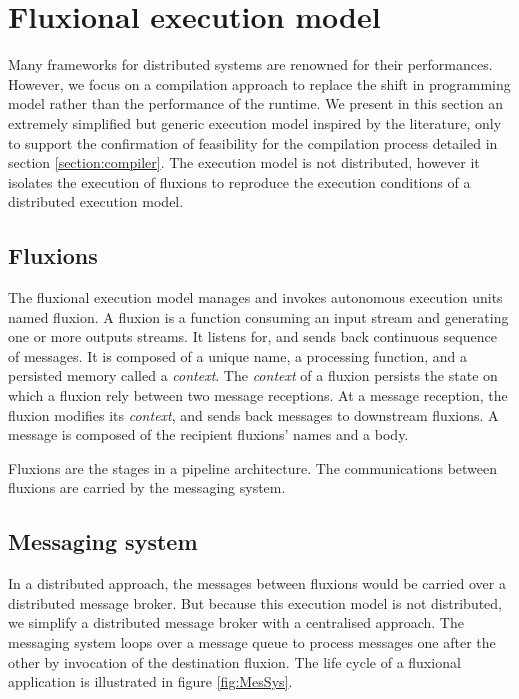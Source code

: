 \section{Fluxional execution model} \label{section:model}

Many frameworks for distributed systems are renowned for their performances\cite{Welsh2000, Jain2006, Wu2007, Zaharia2010, Akidau2013, Marz2011}.
However, we focus on a compilation approach to replace the shift in programming model rather than the performance of the runtime.
We present in this section an extremely simplified but generic execution model inspired by the literature, only to support the confirmation of feasibility for the compilation process detailed in section \ref{section:compiler}.
The execution model is not distributed, however it isolates the execution of fluxions to reproduce the execution conditions of a distributed execution model.


\subsection{Fluxions}

The fluxional execution model manages and invokes autonomous execution units named fluxion.
A fluxion is a function consuming an input stream and generating one or more outputs streams.
It listens for, and sends back continuous sequence of messages.
It is composed of a unique name, a processing function, and a persisted memory called a \textit{context}.
The \textit{context} of a fluxion persists the state on which a fluxion rely between two message receptions.
At a message reception, the fluxion modifies its \textit{context}, and sends back messages to downstream fluxions.
A message is composed of the recipient fluxions' names and a body.


Fluxions are the stages in a pipeline architecture.
The communications between fluxions are carried by the messaging system.

\subsection{Messaging system}

In a distributed approach, the messages between fluxions would be carried over a distributed message broker.
But because this execution model is not distributed, we simplify a distributed message broker with a centralised approach.
The messaging system loops over a message queue to process messages one after the other by invocation of the destination fluxion.
The life cycle of a fluxional application is illustrated in figure \ref{fig:MesSys}.

